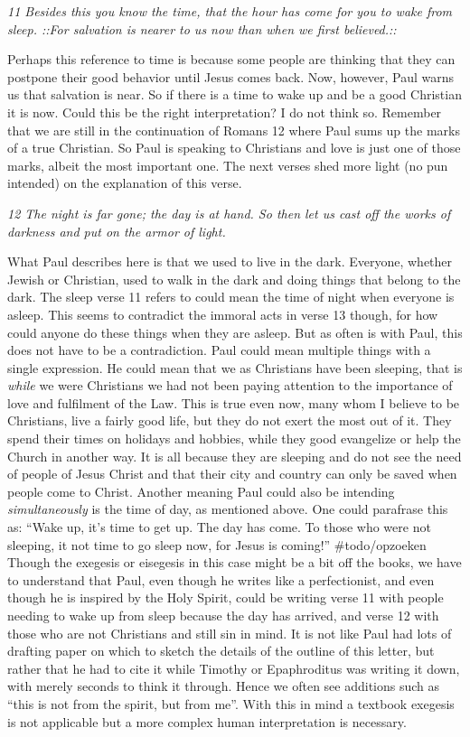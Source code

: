 \emph{11 Besides this you know the time, that the hour has come for you
to wake from sleep. ::For salvation is nearer to us now than when we
first believed.::}

Perhaps this reference to time is because some people are thinking that
they can postpone their good behavior until Jesus comes back. Now,
however, Paul warns us that salvation is near. So if there is a time to
wake up and be a good Christian it is now. Could this be the right
interpretation? I do not think so. Remember that we are still in the
continuation of Romans 12 where Paul sums up the marks of a true
Christian. So Paul is speaking to Christians and love is just one of
those marks, albeit the most important one. The next verses shed more
light (no pun intended) on the explanation of this verse.

\emph{12 The night is far gone; the day is at hand. So then let us cast
off the works of darkness and put on the armor of light.}

What Paul describes here is that we used to live in the dark. Everyone,
whether Jewish or Christian, used to walk in the dark and doing things
that belong to the dark. The sleep verse 11 refers to could mean the
time of night when everyone is asleep. This seems to contradict the
immoral acts in verse 13 though, for how could anyone do these things
when they are asleep. But as often is with Paul, this does not have to
be a contradiction. Paul could mean multiple things with a single
expression. He could mean that we as Christians have been sleeping, that
is \emph{while} we were Christians we had not been paying attention to
the importance of love and fulfilment of the Law. This is true even now,
many whom I believe to be Christians, live a fairly good life, but they
do not exert the most out of it. They spend their times on holidays and
hobbies, while they good evangelize or help the Church in another way.
It is all because they are sleeping and do not see the need of people of
Jesus Christ and that their city and country can only be saved when
people come to Christ. Another meaning Paul could also be intending
\emph{simultaneously} is the time of day, as mentioned above. One could
parafrase this as: ``Wake up, it's time to get up. The day has come. To
those who were not sleeping, it not time to go sleep now, for Jesus is
coming!'' \#todo/opzoeken Though the exegesis or eisegesis in this case
might be a bit off the books, we have to understand that Paul, even
though he writes like a perfectionist, and even though he is inspired by
the Holy Spirit, could be writing verse 11 with people needing to wake
up from sleep because the day has arrived, and verse 12 with those who
are not Christians and still sin in mind. It is not like Paul had lots
of drafting paper on which to sketch the details of the outline of this
letter, but rather that he had to cite it while Timothy or Epaphroditus
was writing it down, with merely seconds to think it through. Hence we
often see additions such as ``this is not from the spirit, but from
me''. With this in mind a textbook exegesis is not applicable but a more
complex human interpretation is necessary.

